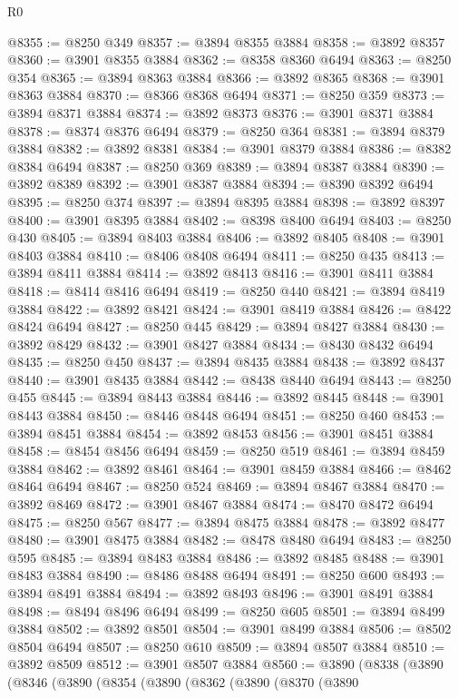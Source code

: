 \begin{lexlean}{R0}
\begin{coremodule}
@8355 := @8250 @349
@8357 := @3894 @8355 @3884
@8358 := @3892 @8357
@8360 := @3901 @8355 @3884
@8362 := @8358 @8360 @6494
@8363 := @8250 @354
@8365 := @3894 @8363 @3884
@8366 := @3892 @8365
@8368 := @3901 @8363 @3884
@8370 := @8366 @8368 @6494
@8371 := @8250 @359
@8373 := @3894 @8371 @3884
@8374 := @3892 @8373
@8376 := @3901 @8371 @3884
@8378 := @8374 @8376 @6494
@8379 := @8250 @364
@8381 := @3894 @8379 @3884
@8382 := @3892 @8381
@8384 := @3901 @8379 @3884
@8386 := @8382 @8384 @6494
@8387 := @8250 @369
@8389 := @3894 @8387 @3884
@8390 := @3892 @8389
@8392 := @3901 @8387 @3884
@8394 := @8390 @8392 @6494
@8395 := @8250 @374
@8397 := @3894 @8395 @3884
@8398 := @3892 @8397
@8400 := @3901 @8395 @3884
@8402 := @8398 @8400 @6494
@8403 := @8250 @430
@8405 := @3894 @8403 @3884
@8406 := @3892 @8405
@8408 := @3901 @8403 @3884
@8410 := @8406 @8408 @6494
@8411 := @8250 @435
@8413 := @3894 @8411 @3884
@8414 := @3892 @8413
@8416 := @3901 @8411 @3884
@8418 := @8414 @8416 @6494
@8419 := @8250 @440
@8421 := @3894 @8419 @3884
@8422 := @3892 @8421
@8424 := @3901 @8419 @3884
@8426 := @8422 @8424 @6494
@8427 := @8250 @445
@8429 := @3894 @8427 @3884
@8430 := @3892 @8429
@8432 := @3901 @8427 @3884
@8434 := @8430 @8432 @6494
@8435 := @8250 @450
@8437 := @3894 @8435 @3884
@8438 := @3892 @8437
@8440 := @3901 @8435 @3884
@8442 := @8438 @8440 @6494
@8443 := @8250 @455
@8445 := @3894 @8443 @3884
@8446 := @3892 @8445
@8448 := @3901 @8443 @3884
@8450 := @8446 @8448 @6494
@8451 := @8250 @460
@8453 := @3894 @8451 @3884
@8454 := @3892 @8453
@8456 := @3901 @8451 @3884
@8458 := @8454 @8456 @6494
@8459 := @8250 @519
@8461 := @3894 @8459 @3884
@8462 := @3892 @8461
@8464 := @3901 @8459 @3884
@8466 := @8462 @8464 @6494
@8467 := @8250 @524
@8469 := @3894 @8467 @3884
@8470 := @3892 @8469
@8472 := @3901 @8467 @3884
@8474 := @8470 @8472 @6494
@8475 := @8250 @567
@8477 := @3894 @8475 @3884
@8478 := @3892 @8477
@8480 := @3901 @8475 @3884
@8482 := @8478 @8480 @6494
@8483 := @8250 @595
@8485 := @3894 @8483 @3884
@8486 := @3892 @8485
@8488 := @3901 @8483 @3884
@8490 := @8486 @8488 @6494
@8491 := @8250 @600
@8493 := @3894 @8491 @3884
@8494 := @3892 @8493
@8496 := @3901 @8491 @3884
@8498 := @8494 @8496 @6494
@8499 := @8250 @605
@8501 := @3894 @8499 @3884
@8502 := @3892 @8501
@8504 := @3901 @8499 @3884
@8506 := @8502 @8504 @6494
@8507 := @8250 @610
@8509 := @3894 @8507 @3884
@8510 := @3892 @8509
@8512 := @3901 @8507 @3884
@8560 := @3890
    (@8338
      (@3890
        (@8346
          (@3890
            (@8354
              (@3890
                (@8362
                  (@3890
                    (@8370
                      (@3890

\end{coremodule}
\end{lexlean}
